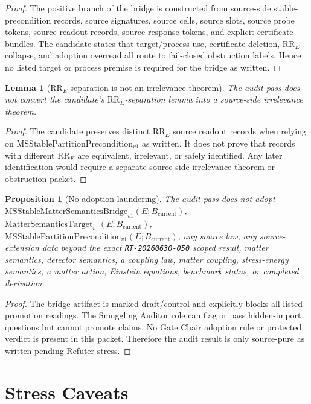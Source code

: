 \documentclass[11pt]{article}
\newcommand{\Bcur}{B_{\mathrm{current}}}
\newcommand{\MSBridge}{\mathrm{MSStableMatterSemanticsBridge}_{v1}}
\newcommand{\MSStablePre}{\mathrm{MSStablePartitionPrecondition}_{v1}}
\newcommand{\Target}{\mathrm{MatterSemanticsTarget}_{v1}}
\newtheorem{lemma}{Lemma}
\newtheorem{proposition}{Proposition}
\begin{document}
\begin{proof}
The positive branch of the bridge is constructed from source-side
stable-precondition records, source signatures, source cells, source slots,
source probe tokens, source readout records, source response tokens, and
explicit certificate bundles. The candidate states that target/process use,
certificate deletion, \(\mathrm{RR}_E\) collapse, and adoption overread all
route to fail-closed obstruction labels. Hence no listed target or process
premise is required for the bridge as written.
\end{proof}

\begin{lemma}[\(\mathrm{RR}_E\) separation is not an irrelevance theorem]
The audit pass does not convert the candidate's \(\mathrm{RR}_E\)-separation
lemma into a source-side irrelevance theorem.
\end{lemma}

\begin{proof}
The candidate preserves distinct \(\mathrm{RR}_E\) source readout records
when relying on \(\MSStablePre\) as written. It does not prove that records
with different \(\mathrm{RR}_E\) are equivalent, irrelevant, or safely
identified. Any later identification would require a separate source-side
irrelevance theorem or obstruction packet.
\end{proof}

\begin{proposition}[No adoption laundering]
The audit pass does not adopt \(\MSBridge(E;\Bcur)\), \(\Target(E;\Bcur)\),
\(\MSStablePre(E;\Bcur)\), any source law, any source-extension data beyond
the exact \texttt{RT-20260630-050} scoped result, matter semantics, detector
semantics, a coupling law, matter coupling, stress-energy semantics, a matter
action, Einstein equations, benchmark status, or completed derivation.
\end{proposition}

\begin{proof}
The bridge artifact is marked draft/control and explicitly blocks all listed
promotion readings. The Smuggling Auditor role can flag or pass hidden-import
questions but cannot promote claims. No Gate Chair adoption rule or protected
verdict is present in this packet. Therefore the audit result is only
source-pure as written pending Refuter stress.
\end{proof}

\section{Stress Caveats}
\end{document}
